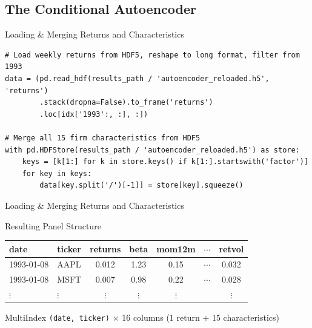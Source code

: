 \documentclass[aspectratio=169, 11pt]{beamer}
\begin{document}
%
\subsection{The Conditional Autoencoder}
%
\begin{frame}[fragile]{Loading \& Merging Returns and Characteristics}

\begin{lstlisting}
# Load weekly returns from HDF5, reshape to long format, filter from 1993
data = (pd.read_hdf(results_path / 'autoencoder_reloaded.h5', 'returns')
        .stack(dropna=False).to_frame('returns')
        .loc[idx['1993':, :], :])

# Merge all 15 firm characteristics from HDF5
with pd.HDFStore(results_path / 'autoencoder_reloaded.h5') as store:
    keys = [k[1:] for k in store.keys() if k[1:].startswith('factor')]
    for key in keys:
        data[key.split('/')[-1]] = store[key].squeeze()
\end{lstlisting}
\end{frame}
%
%
\begin{frame}[fragile]{Loading \& Merging Returns and Characteristics}

\begin{block}{Resulting Panel Structure}
\centering\small
\begin{tabular}{llccccc}
\toprule
\textbf{date} & \textbf{ticker} & \textbf{returns} & \textbf{beta} & \textbf{mom12m} & $\cdots$ & \textbf{retvol} \\
\midrule
1993-01-08 & AAPL & 0.012 & 1.23 & 0.15 & $\cdots$ & 0.032 \\
1993-01-08 & MSFT & 0.007 & 0.98 & 0.22 & $\cdots$ & 0.028 \\
$\vdots$ & $\vdots$ & $\vdots$ & $\vdots$ & $\vdots$ & & $\vdots$ \\
\bottomrule
\end{tabular}

\medskip
MultiIndex \texttt{(date, ticker)} $\times$ 16 columns (1 return + 15 characteristics)
\end{block}

\end{frame}
%
%
\end{document}
